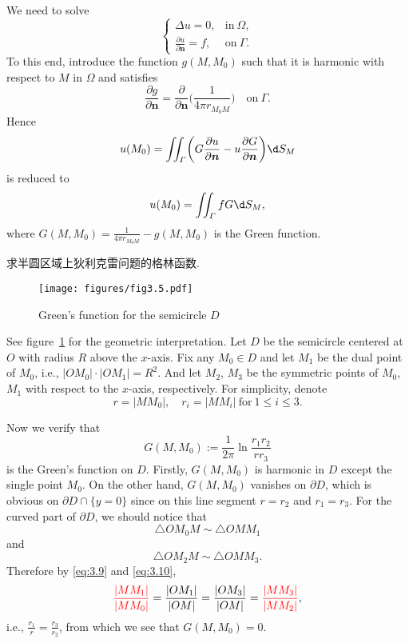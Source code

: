 \begin{solution}
  We need to solve 
  \[\begin{cases}
    \Delta u = 0, & \text{in}\ \varOmega, \\
    \frac{\partial u}{\partial\bm{n}} = f, & \text{on}\ \varGamma.
  \end{cases}\]
  To this end, introduce the function $g(M,M_0)$
  such that it is harmonic with respect to $M$ in $\varOmega$ and satisfies
  \[ \frac{\partial g}{\partial\bm{n}}
    = \frac{\partial}{\partial\bm{n}} \biggl(\frac{1}{4\pi r_{M_0M}}\biggr)
    \quad\text{on}\ \varGamma. \]
  Hence
  \[ u(M_0) = \iint_\varGamma \biggl(G\frac{\partial u}{\partial\bm{n}}
      - u \frac{\partial G}{\partial\bm{n}}\biggr) \d S_M \]
  is reduced to
  \[ u(M_0) = \iint_\varGamma fG \d S_M, \]
  where $G(M,M_0) = \frac{1}{4\pi r_{M_0M}} - g(M,M_0)$ is the Green function.
\end{solution}


\begin{exercise}
  求半圆区域上狄利克雷问题的格林函数.
\end{exercise}

\begin{solve}
  \begin{figure}
    \centering
    \texttt{[image: figures/fig3.5.pdf]}
    \caption{Green's function for the semicircle $D$}
    \label{fig:3.1}
  \end{figure}
  See figure~\ref{fig:3.1} for the geometric interpretation.
  Let $D$ be the semicircle centered at $O$ with radius $R$ above the $x$-axis.
  Fix any $M_0\in D$ and let $M_1$ be the dual point of $M_0$, i.e.,
  $|OM_0|\cdot|OM_1|=R^2$.
  And let $M_2$, $M_3$ be the symmetric points of $M_0$, $M_1$
  with respect to the $x$-axis, respectively.
  For simplicity, denote
  \[ r = |MM_0|,\quad r_i = |MM_i|\ \text{for}\ 1\leq i\leq 3. \]

  Now we verify that
  \[ G(M,M_0) := \frac{1}{2\pi} \ln\frac{r_1r_2}{rr_3} \]
  is the Green's function on $D$.
  Firstly, $G(M,M_0)$ is harmonic in $D$ except the single point $M_0$.
  On the other hand, $G(M,M_0)$ vanishes on $\partial D$,
  which is obvious on $\partial D\cap \{y=0\}$
  since on this line segment $r=r_2$ and $r_1=r_3$.
  For the curved part of $\partial D$, we should notice that
  \begin{equation}\label{eq:3.9}
    \triangle OM_0M \sim \triangle OMM_1
  \end{equation}
  and
  \begin{equation}\label{eq:3.10}
    \triangle OM_2M \sim \triangle OMM_3.
  \end{equation}
  Therefore by \eqref{eq:3.9} and \eqref{eq:3.10},
  \begin{equation}\label{eq:3.11}
    \mathcolor{red}{\frac{|MM_1|}{|MM_0|}}
    = \frac{|OM_1|}{|OM|}
    = \frac{|OM_3|}{|OM|} 
    = \mathcolor{red}{\frac{|MM_3|}{|MM_2|}},
  \end{equation}
  i.e., $\frac{r_1}{r} = \frac{r_3}{r_2}$, from which we see that $G(M,M_0) = 0$.
\end{solve}


